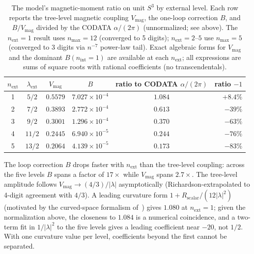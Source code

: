 \documentclass[11pt]{article}
\begin{document}
\begin{table}[h]
\centering
\caption{The model's magnetic-moment ratio on unit $S^3$ by external
level.  Each row reports the tree-level magnetic coupling
$V_{\mathrm{mag}}$, the one-loop correction $B$, and $B/V_{\mathrm{mag}}$
divided by the CODATA $\alpha/(2\pi)$ (unnormalized; see above).
The $n_{\mathrm{ext}} = 1$ result uses $n_{\max} = 12$ (converged
to 5 digits); $n_{\mathrm{ext}} = 2$--$5$ use $n_{\max} = 5$
(converged to 3 digits via $n^{-7}$ power-law tail).
Exact algebraic forms for $V_{\mathrm{mag}}$ and the dominant
$B(n_{\mathrm{int}}=1)$ are available at each $n_{\mathrm{ext}}$;
all expressions are sums of square roots with rational coefficients
(no transcendentals).}
\label{tab:mode_dependence}
\begin{tabular}{@{}cccccr@{}}
\toprule
$n_{\mathrm{ext}}$ & $\lambda_{\mathrm{ext}}$
  & $V_{\mathrm{mag}}$ & $B$
  & ratio to CODATA $\alpha/(2\pi)$ & ratio $-1$ \\
\midrule
1 & $5/2$   & $0.5579$ & $7.027 \times 10^{-4}$ & $1.084$ & $+8.4\%$ \\
2 & $7/2$   & $0.3893$ & $2.772 \times 10^{-4}$ & $0.613$ & $-39\%$ \\
3 & $9/2$   & $0.3001$ & $1.296 \times 10^{-4}$ & $0.370$ & $-63\%$ \\
4 & $11/2$  & $0.2445$ & $6.940 \times 10^{-5}$ & $0.244$ & $-76\%$ \\
5 & $13/2$  & $0.2064$ & $4.139 \times 10^{-5}$ & $0.173$ & $-83\%$ \\
\bottomrule
\end{tabular}
\end{table}

The loop correction $B$ drops faster with $n_{\mathrm{ext}}$ than the
tree-level coupling: across the five levels $B$ spans a factor of
$17\times$ while $V_{\mathrm{mag}}$ spans $2.7\times$.  The tree-level
amplitude follows $V_{\mathrm{mag}} \to (4/3)/|\lambda|$
asymptotically (Richardson-extrapolated to 4-digit agreement with
$4/3$).  A leading curvature form $1 + R_{\mathrm{scalar}}/(12|\lambda|^2)$
(motivated by the curved-space formalism of~\cite{parker1980}) gives
$1.080$ at $n_{\mathrm{ext}} = 1$; given the normalization above, the
closeness to $1.084$ is a numerical coincidence, and a two-term fit in
$1/|\lambda|^2$ to the five levels gives a leading coefficient near
$-20$, not $1/2$.  With one curvature value per level, coefficients
beyond the first cannot be separated.
\end{document}
